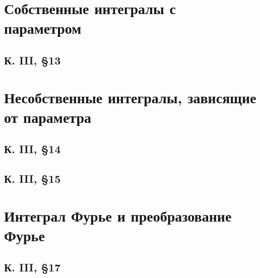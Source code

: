 




\section{Собственные интегралы с параметром}


\subsection{К. III, \S 13}





\section{Несобственные интегралы, зависящие от параметра}



\subsection{К. III, \S 14}





\subsection{К. III, \S 15}





\section{Интеграл Фурье и преобразование Фурье}


\subsection{К. III, \S 17}












